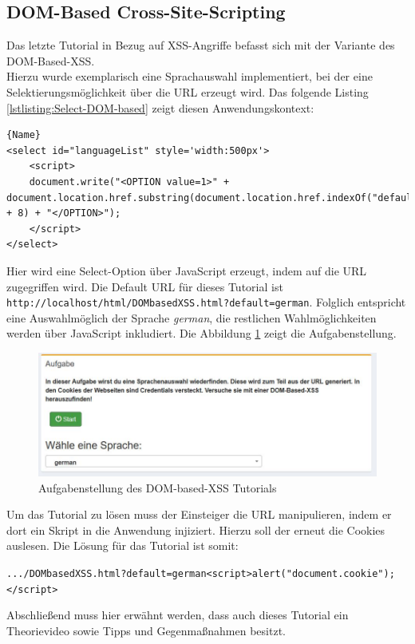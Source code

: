 \subsection{DOM-Based Cross-Site-Scripting}
Das letzte Tutorial in Bezug auf XSS-Angriffe befasst sich mit der Variante des DOM-Based-XSS. \\ 
Hierzu wurde exemplarisch eine Sprachauswahl implementiert, bei der eine Selektierungsmöglichkeit über die URL erzeugt wird. Das folgende Listing \ref{lstlisting:Select-DOM-based} zeigt diesen Anwendungskontext: 
\begin{lstlisting}[caption=Select-Statement\label{lstlisting:Select-DOM-based}]{Name}
<select id="languageList" style='width:500px'>
	<script>
	document.write("<OPTION value=1>" + 				document.location.href.substring(document.location.href.indexOf("default=") + 8) + "</OPTION>");
	</script>
</select>
\end{lstlisting}
Hier wird eine Select-Option über JavaScript erzeugt, indem auf die URL zugegriffen wird. Die Default URL für dieses Tutorial ist \\ \colorbox{altgray}{\lstinline|http://localhost/html/DOMbasedXSS.html?default=german|}. Folglich entspricht eine Auswahlmöglich der Sprache \textit{german}, die restlichen Wahlmöglichkeiten werden über JavaScript inkludiert. Die Abbildung \ref{fig:dom-based-xss-aufgabe} zeigt die Aufgabenstellung. 
\begin{figure}[H]
	\centering
	\includegraphics[width=\textwidth]{images/XSS/dom-based-xss-aufgabe.jpg}
	\caption{Aufgabenstellung des DOM-based-XSS Tutorials}
	\label{fig:dom-based-xss-aufgabe}
\end{figure}
Um das Tutorial zu lösen muss der Einsteiger die URL manipulieren, indem er dort ein Skript in die Anwendung injiziert. Hierzu soll der erneut die Cookies auslesen. Die Lösung für das Tutorial ist somit: 
\begin{center} 
\colorbox{altgray}{\lstinline|.../DOMbasedXSS.html?default=german<script>alert("document.cookie");</script>|} 
\end{center}
Abschließend muss hier erwähnt werden, dass auch dieses Tutorial ein Theorievideo sowie Tipps und Gegenmaßnahmen besitzt. 





